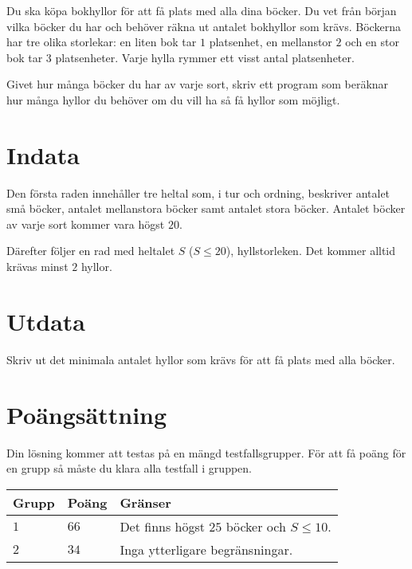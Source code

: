 Du ska köpa bokhyllor för att få plats med alla dina böcker.
Du vet från början vilka böcker du har och behöver räkna ut antalet bokhyllor som krävs.
Böckerna har tre olika storlekar: en liten bok tar $1$ platsenhet, en mellanstor $2$ och en stor bok tar $3$ platsenheter.
Varje hylla rymmer ett visst antal platsenheter.

Givet hur många böcker du har av varje sort, skriv ett program som beräknar hur många hyllor du behöver om du vill ha så få hyllor som möjligt.

\section*{Indata}
Den första raden innehåller tre heltal som, i tur och ordning, beskriver antalet små böcker, antalet mellanstora böcker samt antalet stora böcker.
Antalet böcker av varje sort kommer vara högst $20$.

Därefter följer en rad med heltalet $S$ ($S \le 20$), hyllstorleken.
Det kommer alltid krävas minst $2$ hyllor.

\section*{Utdata}
Skriv ut det minimala antalet hyllor som krävs för att få plats med alla böcker.

\section*{Poängsättning}
Din lösning kommer att testas på en mängd testfallsgrupper.
För att få poäng för en grupp så måste du klara alla testfall i gruppen.


\noindent
\begin{tabular}{| l | l | p{12cm} |}
  \hline
  \textbf{Grupp} & \textbf{Poäng} & \textbf{Gränser} \\ \hline
  $1$    & $66$        & Det finns högst $25$ böcker och $S \le 10$. \\ \hline 
  $2$    & $34$        & Inga ytterligare begränsningar. \\ \hline 
\end{tabular}

